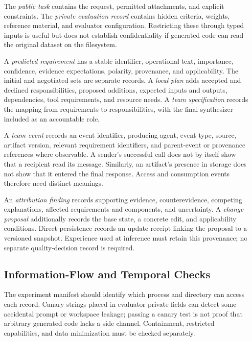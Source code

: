 The \emph{public task} contains the request, permitted attachments, and explicit constraints. The \emph{private evaluation record} contains hidden criteria, weights, reference material, and evaluator configuration. Restricting these through typed inputs is useful but does not establish confidentiality if generated code can read the original dataset on the filesystem.

A \emph{predicted requirement} has a stable identifier, operational text, importance, confidence, evidence expectations, polarity, provenance, and applicability. The initial and negotiated sets are separate records. A \emph{local plan} adds accepted and declined responsibilities, proposed additions, expected inputs and outputs, dependencies, tool requirements, and resource needs. A \emph{team specification} records the mapping from requirements to responsibilities, with the final synthesizer included as an accountable role.

A \emph{team event} records an event identifier, producing agent, event type, source, artifact version, relevant requirement identifiers, and parent-event or provenance references where observable. A sender's successful call does not by itself show that a recipient read its message. Similarly, an artifact's presence in storage does not show that it entered the final response. Access and consumption events therefore need distinct meanings.

An \emph{attribution finding} records supporting evidence, counterevidence, competing explanations, affected requirements and components, and uncertainty. A \emph{change proposal} additionally records the base state, a concrete edit, and applicability conditions. Direct persistence records an update receipt linking the proposal to a versioned snapshot. Experience used at inference must retain this provenance; no separate quality-decision record is required.

\subsection{Information-Flow and Temporal Checks}

The experiment manifest should identify which process and directory can access each record. Canary strings placed in evaluator-private fields can detect some accidental prompt or workspace leakage; passing a canary test is not proof that arbitrary generated code lacks a side channel. Containment, restricted capabilities, and data minimization must be checked separately.

